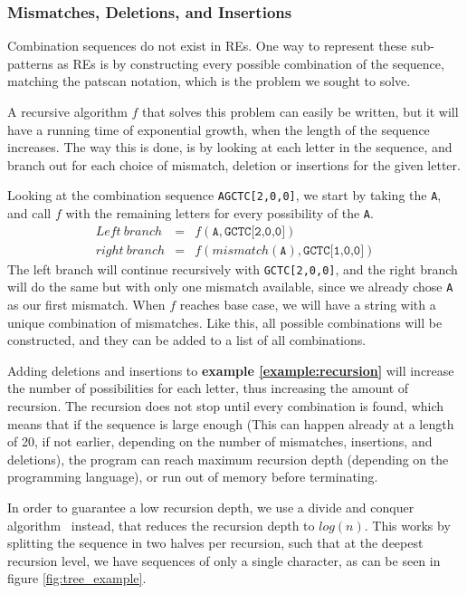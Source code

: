 \documentclass[12pt]{article}
\theoremstyle{definition}
\begin{document}
\subsubsection{Mismatches, Deletions, and Insertions}

Combination sequences do not exist in REs. One way to represent these sub-patterns as REs is by constructing every possible combination of the sequence, matching the patscan notation, which is the problem we sought to solve.

A recursive algorithm $f$ that solves this problem can easily be written, but it will have a running time of exponential growth, when the length of the sequence increases. The way this is done, is by looking at each letter in the sequence, and branch out for each choice of mismatch, deletion or insertions for the given letter.

\begin{example}[label=example:recursion]
Looking at the combination sequence \texttt{AGCTC[2,0,0]}, we start by taking the \texttt{A}, and call $f$ with the remaining letters for every possibility of the \texttt{A}.
\begin{eqnarray}
	Left\ branch &=& f(\texttt{A}, \texttt{GCTC[2,0,0]}) \\
	right\ branch &=& f(mismatch(\texttt{A}), \texttt{GCTC[1,0,0]})
\end{eqnarray}
The left branch will continue recursively with \texttt{GCTC[2,0,0]}, and the right branch will do the same but with only one mismatch available, since we already chose \texttt{A} as our first mismatch. When $f$ reaches base case, we will have a string with a unique combination of mismatches. Like this, all possible combinations will be constructed, and they can be added to a list of all combinations.
\end{example}

Adding deletions and insertions to \textbf{example \ref{example:recursion}} will increase the number of possibilities for each letter, thus increasing the amount of recursion. The recursion does not stop until every combination is found, which means that if the sequence is large enough (This can happen already at a length of 20, if not earlier, depending on the number of mismatches, insertions, and deletions), the program can reach maximum recursion depth (depending on the programming language), or run out of memory before terminating.

In order to guarantee a low recursion depth, we use a divide and conquer algorithm~\cite{Algorithms} instead, that reduces the recursion depth to $log(n)$. This works by splitting the sequence in two halves per recursion, such that at the deepest recursion level, we have sequences of only a single character, as can be seen in figure \ref{fig:tree_example}. 
\end{document}
